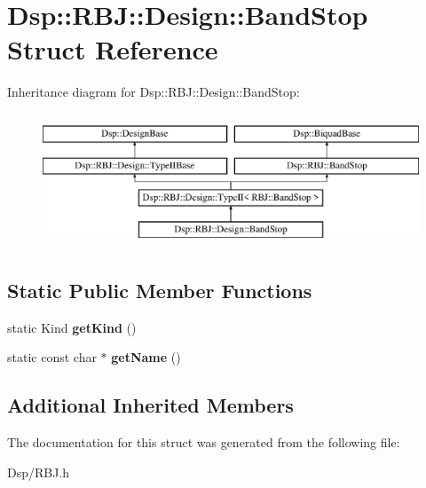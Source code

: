 \hypertarget{structDsp_1_1RBJ_1_1Design_1_1BandStop}{\section{Dsp\-:\-:R\-B\-J\-:\-:Design\-:\-:Band\-Stop Struct Reference}
\label{structDsp_1_1RBJ_1_1Design_1_1BandStop}
}
Inheritance diagram for Dsp\-:\-:R\-B\-J\-:\-:Design\-:\-:Band\-Stop\-:\begin{figure}[H]
\begin{center}
\leavevmode
\includegraphics[height=4.000000cm]{structDsp_1_1RBJ_1_1Design_1_1BandStop}
\end{center}
\end{figure}
\subsection*{Static Public Member Functions}
\begin{DoxyCompactItemize}
\item 
\hypertarget{structDsp_1_1RBJ_1_1Design_1_1BandStop_ad26cfb31bd35a271d96a4c3bcd6e7a3b}{static Kind {\bfseries get\-Kind} ()}\label{structDsp_1_1RBJ_1_1Design_1_1BandStop_ad26cfb31bd35a271d96a4c3bcd6e7a3b}

\item 
\hypertarget{structDsp_1_1RBJ_1_1Design_1_1BandStop_a169478cf693a0917cacb06d26e778f2b}{static const char $\ast$ {\bfseries get\-Name} ()}\label{structDsp_1_1RBJ_1_1Design_1_1BandStop_a169478cf693a0917cacb06d26e778f2b}

\end{DoxyCompactItemize}
\subsection*{Additional Inherited Members}


The documentation for this struct was generated from the following file\-:\begin{DoxyCompactItemize}
\item 
Dsp/R\-B\-J.\-h\end{DoxyCompactItemize}
